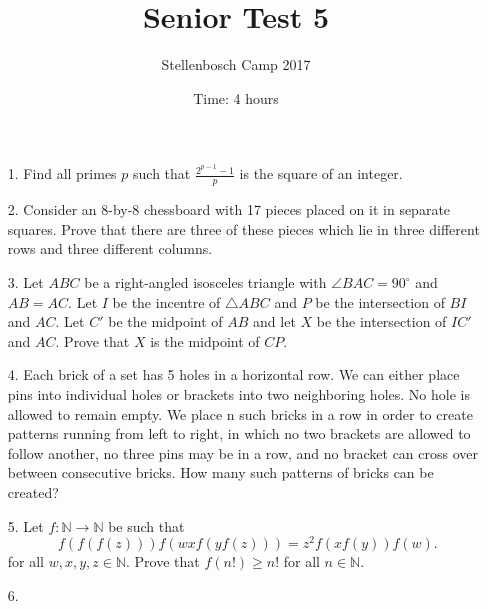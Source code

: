 \documentclass[12pt]{article}
\title{Senior Test 5}
\author{Stellenbosch Camp 2017}
\date{Time: 4 hours}
\begin{document}
 \maketitle

\begin{enumerate}

\item[1.] %
Find all primes $p$ such that $\displaystyle \frac{2^{p-1}-1}{p}$ is the square of an integer.


\item[2.] %
Consider an 8-by-8 chessboard with 17 pieces placed on it in separate squares. Prove that there are three of these pieces which lie in three different rows and three different columns.


\item[3.] %
Let $ABC$ be a right-angled isosceles triangle with $\angle BAC = 90^\circ$ and $AB = AC$. Let $I$ be the incentre of $\triangle ABC$ and $P$ be the intersection of $BI$ and $AC$. Let $C'$ be the midpoint of $AB$ and let $X$ be the intersection of $IC'$ and $AC$. Prove that $X$ is the midpoint of $CP$.


\item[4.] %
Each brick of a set has 5 holes in a horizontal row. We can either place pins into individual holes or brackets into two neighboring holes. No hole is allowed to remain empty. We place n such bricks in a row in order to create patterns running from left to right, in which no two brackets are allowed to follow another, no three pins may be in a row, and no bracket can cross over between consecutive bricks. How many such patterns of bricks can be created?


\item[5.] %
Let $f : \mathbb{N} \to \mathbb{N}$ be such that
  \[ f(f(f(z))) f(wx f(y f(z))) = z^2 f(xf(y)) f(w) .\]
for all $w, x, y, z \in \mathbb{N}$. Prove that $f(n!) \geq n!$ for all $n \in \mathbb{N}$.


\item[6.] %


\end{enumerate}

\vfill

\centering
\begin{BVerbatim}
\end{BVerbatim}
\end{document}
